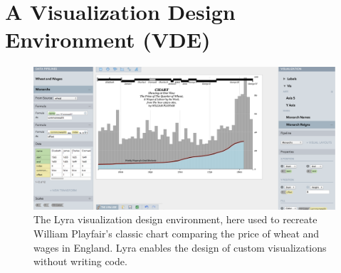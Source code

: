\graphicspath{{./lyra/figures/}}
\chapter{A Visualization Design Environment (VDE)}

\begin{figure}[h!]
  \vspace{-40pt}
  \centering
  \includegraphics[width=\columnwidth]{playfair}
  \caption{The Lyra visualization design environment, here used to recreate William Playfair's classic chart comparing the price of wheat and wages in England. Lyra enables the design of custom visualizations without writing code.}
  \label{fig:lyra:teaser}
\end{figure}






